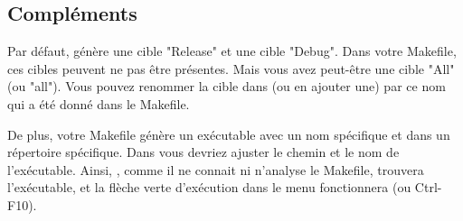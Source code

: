 \subsection{Compléments}

Par défaut, \codeblocks génère une cible "Release" et une cible "Debug". Dans votre Makefile, ces cibles peuvent ne pas être présentes. Mais vous avez peut-être une cible "All" (ou "all"). Vous pouvez renommer la cible dans \codeblocks (ou en ajouter une) par ce nom qui a été donné dans le Makefile. 

De plus, votre Makefile génère un exécutable avec un nom spécifique et dans un répertoire spécifique. Dans \codeblocks vous devriez ajuster le chemin et le nom de l'exécutable. Ainsi, \codeblocks, comme il ne connait ni n'analyse le Makefile, trouvera l'exécutable, et la flèche verte d'exécution dans le menu fonctionnera (ou Ctrl-F10).

